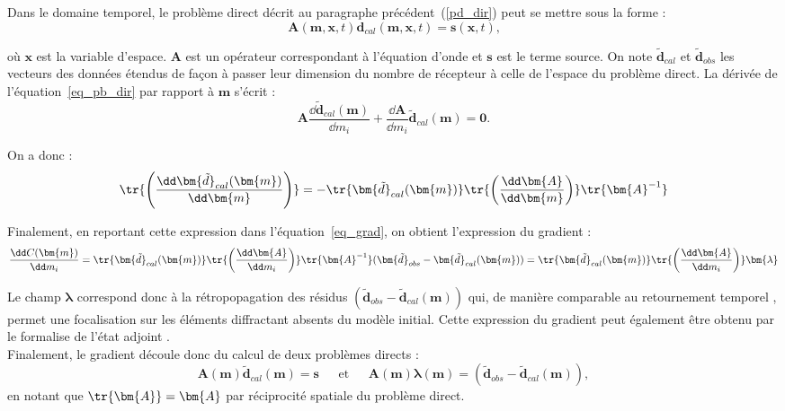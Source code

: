 Dans le domaine temporel, le problème direct décrit au paragraphe précédent~(\ref{pd_dir}) peut se mettre sous la forme :
\begin{equation}
	\bm{A}(\bm{m},\bm{x},t)\bm{d}_{cal}(\bm{m},\bm{x},t)=\bm{s}(\bm{x},t)\text{,}
	\label{eq_pb_dir}
\end{equation}

où $\bm{x}$ est la variable d'espace. $\bm{A}$ est un opérateur correspondant à l'équation d'onde et $\bm{s}$ est le terme source. On note $\bm{\tilde{d}}_{cal}$ et $\bm{\tilde{d}}_{obs}$ les vecteurs des données étendus de façon à passer leur dimension du nombre de récepteur à celle de l'espace du problème direct. La dérivée de l'équation~\ref{eq_pb_dir} par rapport à $\bm{m}$ s'écrit : 
\begin{equation}
	\bm{A} \frac{\dd \bm{\tilde{d}}_{cal}(\bm{m})}{\dd m_{i}} + \frac{\dd \bm{A}}{\dd m_{i}}\bm{\tilde{d}}_{cal}(\bm{m}) = \bm{0} \text{.}
\end{equation}

On a donc : 
\begin{equation}
	\tr{\left( \frac{\dd \bm{\tilde{d}}_{cal}(\bm{m})}{\dd \bm{m}}  \right)} = - \tr{\bm{\tilde{d}}_{cal}(\bm{m})} \tr{\left( \frac{\dd \bm{A}}{\dd \bm{m}} \right)} \tr{\bm{A}^{-1}}
	\label{sub}
\end{equation} 	

Finalement, en reportant cette expression dans l'équation~\ref{eq_grad}, on obtient l'expression du gradient : 
\begin{equation}
	 \frac{\dd C (\bm{m})}{\dd m_{i}} = \tr{\bm{\tilde{d}}_{cal}(\bm{m})}  \tr{\left( \frac{\dd \bm{A}}{\dd m_{i}}\right)} \tr{\bm{A}^{-1}} (\bm{\tilde{d}}_{obs} - \bm{\tilde{d}}_{cal}(\bm{m})) = \tr{\bm{\tilde{d}}_{cal}(\bm{m})} \tr{\left( \frac{\dd \bm{A}}{\dd m_{i}}\right)} \bm{\lambda}
\end{equation}


Le champ $\bm{\lambda}$ correspond donc à la rétropopagation des résidus $( \bm{\tilde{d}}_{obs} - \bm{\tilde{d}}_{cal}(\bm{m}))$ qui, de manière comparable au retournement temporel \citep{prada_2002}, permet une focalisation sur les éléments diffractant absents du modèle initial. Cette expression du gradient peut également être obtenu par le formalise de l'état adjoint \citep{plessix}.\\
Finalement, le gradient découle donc du calcul de deux problèmes directs : 
\begin{equation*}
	\bm{A}(\bm{m})\bm{\tilde{d}}_{cal}(\bm{m})=\bm{s} ~~~~~~~\text{et}~~~~~~~\bm{A}(\bm{m})\bm{\lambda} (\bm{m})=( \bm{\tilde{d}}_{obs} - \bm{\tilde{d}}_{cal}(\bm{m})),
\end{equation*}
en notant que $\tr{\bm{A}}=\bm{A}$ par réciprocité spatiale du problème direct.\\



